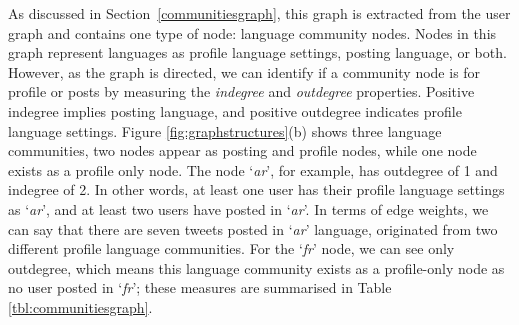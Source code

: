 \documentclass{llncs}
\begin{document}
As discussed in Section~\ref{communitiesgraph}, this graph is
extracted from the user graph and contains one type of node: language
community nodes. Nodes in this graph represent languages as profile
language settings, posting language, or both.  However, as the graph
is directed, we can identify if a community node is for profile or
posts by measuring the \emph{indegree} and \emph{outdegree}
properties.  Positive indegree implies posting language, and positive
outdegree indicates profile language settings. Figure
\ref{fig:graphstructures}(b) shows three language communities, two
nodes appear as posting and profile nodes, while one node exists as a
profile only node. The node `{\emph{ar}}', for example, has outdegree
of 1 and indegree of 2.  In other words, at least one user has their
profile language settings as `{\emph{ar}}', and at least two users
have posted in `{\emph{ar}}'. In terms of edge weights, we can say
that there are seven tweets posted in `{\emph{ar}}' language,
originated from two different profile language communities.  For the
`{\emph{fr}}' node, we can see only outdegree, which means this
language community exists as a profile-only node as no user posted in
`{\emph{fr}}'; these measures are summarised in Table
\ref{tbl:communitiesgraph}.



\end{document}
